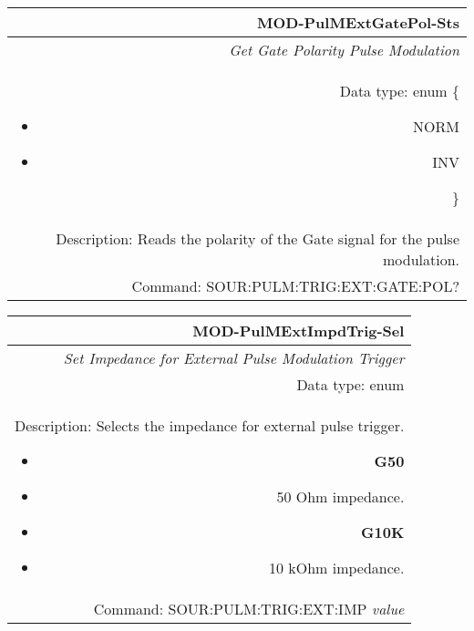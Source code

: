 \documentclass[openany]{article}
\begin{document}
		\begin{tabular}{N}
			\hline
			\bfseries MOD-PulMExtGatePol-Sts \\ \hline
			\emph{Get Gate Polarity Pulse Modulation} \\
			Data type: enum \{\begin{itemize}[noitemsep]
				\small
				\item[] NORM
				\item[] INV
			\end{itemize}\} \\ 
			Description: Reads the polarity of the Gate signal for the pulse modulation. \\
			Command: SOUR:PULM:TRIG:EXT:GATE:POL? \\

		\end{tabular}
%
		\begin{tabular}{N}
			\hline
			\bfseries MOD-PulMExtImpdTrig-Sel \\ \hline
			\emph{Set Impedance for External Pulse Modulation Trigger} \\
			Data type: enum \\  
			Description: Selects the impedance for external pulse trigger. \begin{itemize}[noitemsep]
				\small
				\item[] \textbf{G50}
				\item[] 50 Ohm impedance.
                                \item[] \textbf{G10K}
				\item[] 10 kOhm impedance.
			\end{itemize} \\
			Command: SOUR:PULM:TRIG:EXT:IMP \emph{value} \\

		\end{tabular}
\end{document}
